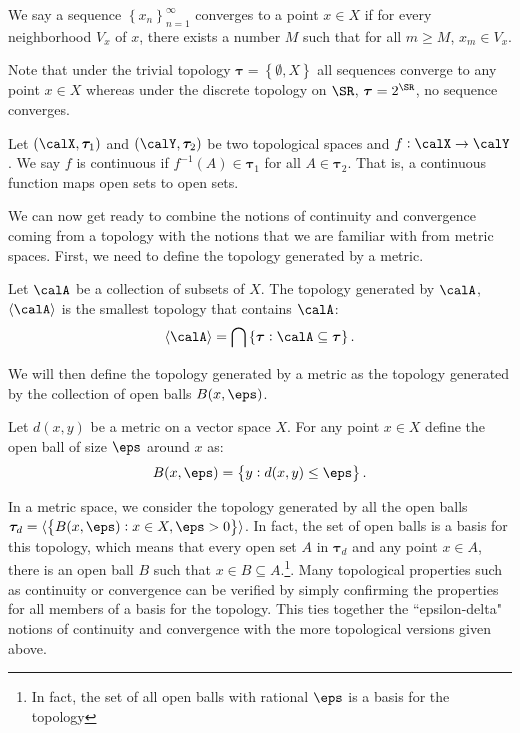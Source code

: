 \begin{definition}[Convergence]
	\label{def:convergence}
	We say a sequence \(\left\{x_n\right\}_{n=1}^\infty\) converges to a point \(x \in X\) if for every neighborhood  \(V_x\) of \(x\), there exists a number  \(M\) such that for all  \(m\geq M\), \(x_m \in V_x\). 
\end{definition}

Note that under the trivial topology \(\boldsymbol{\tau} = \left\{\emptyset, X\right\}\) all sequences converge to any point \(x \in X\) whereas under the discrete topology on  \(\SR\),  \(\boldsymbol{\tau} = 2^\SR\), no sequence converges.


\begin{definition}[Continuity]
	\label{def:continuity}
	Let \((\calX, \boldsymbol{\tau}_1)\) and \((\calY, \boldsymbol{\tau}_2)\) be two topological spaces and \(f:\calX\to\calY\). We say  \(f\) is continuous if  \(f^{-1}(A) \in \boldsymbol{\tau}_1\) for all \(A \in \boldsymbol{\tau}_2\). That is, a continuous function maps open sets to open sets. 
\end{definition}

We can now get ready to combine the notions of continuity and convergence coming from a topology with the notions that we are familiar with from metric spaces. First, we need to define the topology generated by a metric. 

\begin{definition}
	\label{def:generated}
	Let \(\calA\) be a collection of subsets of  \(X\). The topology generated by  \(\calA\), \(\langle\calA\rangle\) is the smallest topology that contains \(\calA\):
	\[
		\langle\calA\rangle = \bigcap \left\{\boldsymbol\tau: \calA\subseteq\boldsymbol{\tau}\right\}
	.\] 
\end{definition}

We will then define the topology generated by a metric as the topology generated by the collection of open balls \(B(x,\eps)\).

\begin{definition}
	\label{def:open-ball}
	Let \(d(x,y)\) be a metric on  a vector space  \(X\). For any point  \(x \in X\) define the open ball of size  \(\eps\) around  \(x\) as:
	\[
		B(x,\eps) = \left\{y: d(x,y) \leq \eps\right\}
	.\] 
\end{definition}

In a metric space, we consider the topology generated by all the open balls \(\boldsymbol{\tau}_d = \langle\left\{B(x,\eps):x \in X, \eps > 0\right\}\rangle\). In fact, the set of open balls is a basis for this topology, which means that every open set \(A\) in \(\boldsymbol{\tau}_d\) and any point \(x \in A\), there is an open ball \(B\) such that  \(x \in B \subseteq A\).\footnote{In fact, the set of all open balls with rational \(\eps\) is a basis for the topology}. Many topological properties such as continuity or convergence can be verified by simply confirming the properties for all members of a basis for the topology. This ties together the ``epsilon-delta" notions of continuity and convergence with the more topological versions given above.

